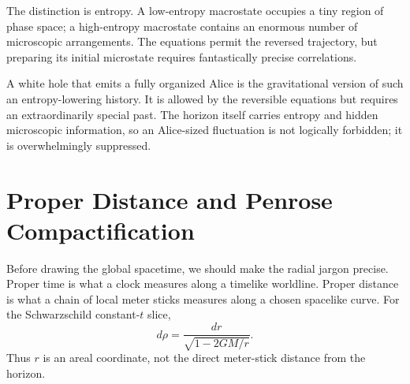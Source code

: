 The distinction is entropy. A low-entropy macrostate occupies a tiny region of phase space; a high-entropy macrostate contains an enormous number of microscopic arrangements. The equations permit the reversed trajectory, but preparing its initial microstate requires fantastically precise correlations.

\begin{classroomqa}
\end{classroomqa}

A white hole that emits a fully organized Alice is the gravitational version of such an entropy-lowering history. It is allowed by the reversible equations but requires an extraordinarily special past. The horizon itself carries entropy and hidden microscopic information, so an Alice-sized fluctuation is not logically forbidden; it is overwhelmingly suppressed.

\begin{classroomqa}
\end{classroomqa}

\section{Proper Distance and Penrose Compactification}

Before drawing the global spacetime, we should make the radial jargon precise. Proper time is what a clock measures along a timelike worldline. Proper distance is what a chain of local meter sticks measures along a chosen spacelike curve. For the Schwarzschild constant-\(t\) slice,
\begin{equation}
d\rho=\frac{dr}{\sqrt{1-2GM/r}}.
\label{eq:l04-proper-distance}
\end{equation}
Thus \(r\) is an areal coordinate, not the direct meter-stick distance from the horizon.

